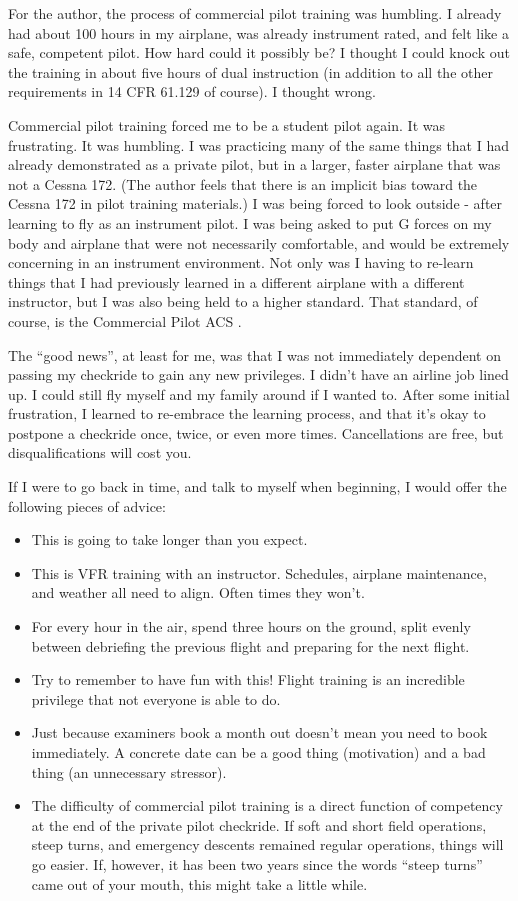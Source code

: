 For the author, the process of commercial pilot training was humbling. I already had about 100 hours in my airplane, was already instrument rated, and felt like a safe, competent pilot. How hard could it possibly be? I thought I could knock out the training in about five hours of dual instruction (in addition to all the other requirements in 14 CFR 61.129 of course). I thought wrong.

Commercial pilot training forced me to be a student pilot again. It was frustrating. It was humbling. I was practicing many of the same things that I had already demonstrated as a private pilot, but in a larger, faster airplane that was not a Cessna 172. (The author feels that there is an implicit bias toward the Cessna 172 in pilot training materials.) I was being forced to look outside - after learning to fly as an instrument pilot. I was being asked to put G forces on my body and airplane that were not necessarily comfortable, and would be extremely concerning in an instrument environment. Not only was I having to re-learn things that I had previously learned in a different airplane with a different instructor, but I was also being held to a higher standard. That standard, of course, is the Commercial Pilot ACS \cite{acs-commercial}.

The ``good news'', at least for me, was that I was not immediately dependent on passing my checkride to gain any new privileges. I didn't have an airline job lined up. I could still fly myself and my family around if I wanted to. After some initial frustration, I learned to re-embrace the learning process, and that it's okay to postpone a checkride once, twice, or even more times. Cancellations are free, but disqualifications will cost you.

If I were to go back in time, and talk to myself when beginning, I would offer the following pieces of advice:

\begin{itemize}
    \item This is going to take longer than you expect.
    \item This is VFR training with an instructor. Schedules, airplane maintenance, and weather all need to align. Often times they won't.
    \item For every hour in the air, spend three hours on the ground, split evenly between debriefing the previous flight and preparing for the next flight.
    \item Try to remember to have fun with this! Flight training is an incredible privilege that not everyone is able to do.
    \item Just because examiners book a month out doesn't mean you need to book immediately. A concrete date can be a good thing (motivation) and a bad thing (an unnecessary stressor).
    \item The difficulty of commercial pilot training is a direct function of competency at the end of the private pilot checkride. If soft and short field operations, steep turns, and emergency descents remained regular operations, things will go easier. If, however, it has been two years since the words ``steep turns'' came out of your mouth, this might take a little while.
\end{itemize}

